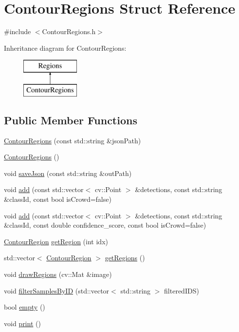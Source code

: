 \hypertarget{struct_contour_regions}{}\section{Contour\+Regions Struct Reference}
\label{struct_contour_regions}


{\ttfamily \#include $<$Contour\+Regions.\+h$>$}

Inheritance diagram for Contour\+Regions\+:\begin{figure}[H]
\begin{center}
\leavevmode
\includegraphics[height=2.000000cm]{struct_contour_regions}
\end{center}
\end{figure}
\subsection*{Public Member Functions}
\begin{DoxyCompactItemize}
\item 
\hyperlink{struct_contour_regions_a5e20ac69cb42cdf4831527ca7bca4cca}{Contour\+Regions} (const std\+::string \&json\+Path)
\item 
\hyperlink{struct_contour_regions_a75995164ca89b67bc5b34b59cd532056}{Contour\+Regions} ()
\item 
void \hyperlink{struct_contour_regions_a78fc9a246628abb76f5765c4102847e4}{save\+Json} (const std\+::string \&out\+Path)
\item 
void \hyperlink{struct_contour_regions_aeb483510869f1dcb141b26043eaf12f0}{add} (const std\+::vector$<$ cv\+::\+Point $>$ \&detections, const std\+::string \&class\+Id, const bool is\+Crowd=false)
\item 
void \hyperlink{struct_contour_regions_a77160c9738d01939d6b99588da777be5}{add} (const std\+::vector$<$ cv\+::\+Point $>$ \&detections, const std\+::string \&class\+Id, const double confidence\+\_\+score, const bool is\+Crowd=false)
\item 
\hyperlink{struct_contour_region}{Contour\+Region} \hyperlink{struct_contour_regions_a94961450720d9735337195dee1fd8b53}{get\+Region} (int idx)
\item 
std\+::vector$<$ \hyperlink{struct_contour_region}{Contour\+Region} $>$ \hyperlink{struct_contour_regions_aa48956c2ee10e312023b721ca4adcd07}{get\+Regions} ()
\item 
void \hyperlink{struct_contour_regions_a4f77a669499f53d59e51aa30ec040bc6}{draw\+Regions} (cv\+::\+Mat \&image)
\item 
void \hyperlink{struct_contour_regions_a8320d00da57b3362afb70f6886919534}{filter\+Samples\+By\+ID} (std\+::vector$<$ std\+::string $>$ filtered\+I\+DS)
\item 
bool \hyperlink{struct_contour_regions_ab8b13783859be86bdffa78c3a61e1387}{empty} ()
\item 
void \hyperlink{struct_contour_regions_a9bd987b6b8a1cc27f5ece5b321f1b9ba}{print} ()
\end{DoxyCompactItemize}
